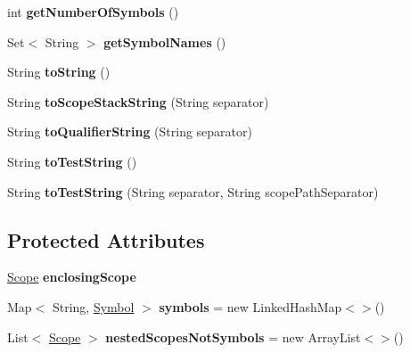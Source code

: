 \begin{DoxyCompactItemize}
\item 
\mbox{\label{classlime_1_1antlr4_1_1BaseScope_afbe0ff3e90cbba8ad2e9486f71e1a38b}} 
int {\bfseries get\+Number\+Of\+Symbols} ()
\item 
\mbox{\label{classlime_1_1antlr4_1_1BaseScope_a2df91cc9ada5859c7827f3fcfad32153}} 
Set$<$ String $>$ {\bfseries get\+Symbol\+Names} ()
\item 
\mbox{\label{classlime_1_1antlr4_1_1BaseScope_a58c2ca0ff03936e91d080ed2b0213f42}} 
String {\bfseries to\+String} ()
\item 
\mbox{\label{classlime_1_1antlr4_1_1BaseScope_a6cb0d6a6a322a651becba56ce2082425}} 
String {\bfseries to\+Scope\+Stack\+String} (String separator)
\item 
\mbox{\label{classlime_1_1antlr4_1_1BaseScope_a7cba137da26469b1ec56c29a74ba749f}} 
String {\bfseries to\+Qualifier\+String} (String separator)
\item 
\mbox{\label{classlime_1_1antlr4_1_1BaseScope_ae8278e6d3457895e73bd180334ced59f}} 
String {\bfseries to\+Test\+String} ()
\item 
\mbox{\label{classlime_1_1antlr4_1_1BaseScope_ac9c771b481325b78aab6a06630314c0e}} 
String {\bfseries to\+Test\+String} (String separator, String scope\+Path\+Separator)
\end{DoxyCompactItemize}
\subsection*{Protected Attributes}
\begin{DoxyCompactItemize}
\item 
\mbox{\label{classlime_1_1antlr4_1_1BaseScope_a03d117a3d5c9d40796ffdf3e74f7866f}} 
\hyperlink{interfacelime_1_1antlr4_1_1Scope}{Scope} {\bfseries enclosing\+Scope}
\item 
\mbox{\label{classlime_1_1antlr4_1_1BaseScope_ade889728bb27b5aa13f772f5ab18bdc4}} 
Map$<$ String, \hyperlink{interfacelime_1_1antlr4_1_1Symbol}{Symbol} $>$ {\bfseries symbols} = new Linked\+Hash\+Map$<$$>$()
\item 
\mbox{\label{classlime_1_1antlr4_1_1BaseScope_afe902a8fa79fe6e6efe74b9209d6bfef}} 
List$<$ \hyperlink{interfacelime_1_1antlr4_1_1Scope}{Scope} $>$ {\bfseries nested\+Scopes\+Not\+Symbols} = new Array\+List$<$$>$()
\end{DoxyCompactItemize}


